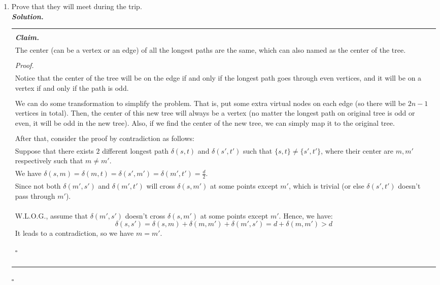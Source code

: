 \documentclass[12pt, a4paper, UTF8]{article}
\newenvironment{solution}[1][\it{Solution}]{\textbf{#1. }\\}{\begin{flushright}$\square$\end{flushright}}
\newenvironment{claim}[1][\it{Claim}]{
    \begin{center}
        \begin{tabular}{|p{0.9\textwidth}|}
    \hline\\
    \textbf{#1. }\\
}{
    \\\\\hline
        \end{tabular}
    \end{center}
}
\begin{document}
    \begin{enumerate}
        \item Prove that they will meet during the trip.\\
            \begin{solution}
                \begin{claim}
                    The center (can be a vertex or an edge) of all the longest paths are the same, which can also named as the center of the tree.  
                    \\\\\it{Proof.}\\
                    Notice that the center of the tree will be on the edge if and only if the longest path goes through even vertices, and it will be on a vertex if and only if the path is odd.\\\\
                    We can do some transformation to simplify the problem. That is, put some extra virtual nodes on each edge (so there will be $2n - 1$ vertices in total). Then, the center of this new tree will always be a vertex (no matter the longest path on original tree is odd or even, it will be odd in the new tree). Also, if we find the center of the new tree, we can simply map it to the original tree.\\\\
                    After that, consider the proof by contradiction as follows:\\
                    Suppose that there exists $2$ different longest path $\delta(s, t)$ and $\delta(s', t')$ such that $\{s, t\} \neq \{s', t'\}$, where their center are $m, m'$ respectively such that $m \neq m'$. \\
                    We have $\delta(s, m) = \delta(m, t) = \delta(s', m') = \delta(m', t') = \frac{d}{2}$.\\
                    Since not both $\delta(m', s')$ and $\delta(m', t')$ will cross $\delta(s, m')$ at some points except $m'$, which is trivial (or else $\delta(s', t')$ doesn't pass through $m'$).\\
                    W.L.O.G., assume that $\delta(m', s')$ doesn't cross $\delta(s, m')$ at some points except $m'$. Hence, we have:
                    $$\delta(s, s') = \delta(s, m) + \delta(m, m') + \delta(m', s') = d + \delta(m, m') > d$$
                    It leads to a contradiction, so we have $m = m'$.
                    \begin{flushright}
                        $\square$

\end{flushright}
\end{claim}
\end{solution}
\end{enumerate}
\end{document}
